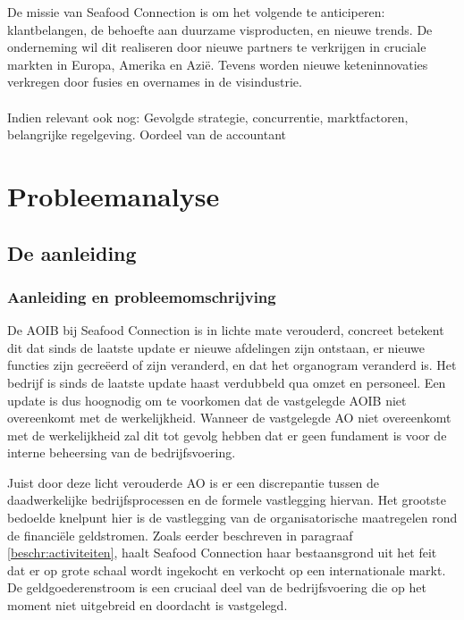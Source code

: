 \documentclass[10pt,a4paper,twoside]{report}
\begin{document}
De missie van Seafood Connection is om het volgende te anticiperen: klantbelangen, de behoefte aan duurzame visproducten, en nieuwe trends. De onderneming wil dit realiseren door nieuwe partners te verkrijgen in cruciale markten in Europa, Amerika en Azië. Tevens worden nieuwe keteninnovaties verkregen door fusies en overnames in de visindustrie. \citep{sfcwebsite} \\
\\
\color{red}
Indien relevant ook nog: Gevolgde strategie, concurrentie, marktfactoren, belangrijke regelgeving. Oordeel van de accountant
\color{black}

\chapter{Probleemanalyse}
\section{De aanleiding}
\subsection{Aanleiding en probleemomschrijving}
De AOIB bij Seafood Connection is in lichte mate verouderd, concreet betekent dit dat sinds de laatste update er nieuwe afdelingen zijn ontstaan, er nieuwe functies zijn gecreëerd of zijn veranderd, en dat het organogram veranderd is. Het bedrijf is sinds de laatste update haast verdubbeld qua omzet en personeel. Een update is dus hoognodig om te voorkomen dat de vastgelegde AOIB niet overeenkomt met de werkelijkheid. Wanneer de vastgelegde AO niet overeenkomt met de werkelijkheid zal dit tot gevolg hebben dat er geen fundament is voor de interne beheersing van de bedrijfsvoering. \citep{bivpraktijk}

Juist door deze licht verouderde AO is er een discrepantie tussen de daadwerkelijke bedrijfsprocessen en de formele vastlegging hiervan. Het grootste bedoelde knelpunt hier is de vastlegging van de organisatorische maatregelen rond de financiële geldstromen. Zoals eerder beschreven in paragraaf \ref{beschr:activiteiten}, haalt Seafood Connection haar bestaansgrond uit het feit dat er op grote schaal wordt ingekocht en verkocht op een internationale markt. De geldgoederenstroom is een cruciaal deel van de bedrijfsvoering die op het moment niet uitgebreid en doordacht is vastgelegd. \citep{aoibsfc}
\end{document}
